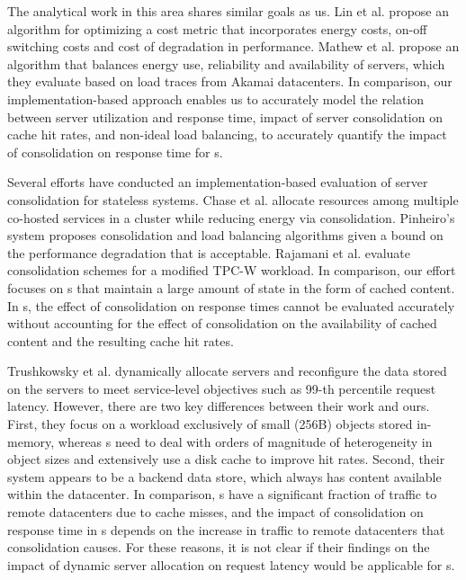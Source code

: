The analytical work in this area shares similar goals as us.  Lin et al. \cite{lin12} propose an algorithm for optimizing a cost metric that incorporates energy costs, on-off switching costs and cost of degradation in performance. Mathew et al. \cite{mathew12} propose an algorithm that balances energy use, reliability and availability of servers, which they evaluate based on load traces from Akamai datacenters. In comparison, our implementation-based approach enables us to accurately model the relation between server utilization and response time, impact of server consolidation on cache hit rates, and non-ideal load balancing, to accurately quantify the impact of consolidation on response time for \cdc s.

Several efforts have conducted an implementation-based evaluation of server consolidation for stateless systems. Chase et al. \cite{chase2001managing} allocate resources among multiple co-hosted services in a cluster while reducing energy via consolidation. Pinheiro's \cite{pinheiro2001load} system proposes consolidation and load balancing algorithms given a bound on the performance degradation that is acceptable.  Rajamani et al. \cite{rajamani2003evaluating} evaluate consolidation schemes for a modified TPC-W workload. In comparison, our effort focuses on \cdc s that maintain a large amount of state in the form of cached content. In \cdc s, the effect of consolidation on response times cannot be evaluated accurately without accounting for the effect of consolidation on the availability of cached content and the resulting cache hit rates.

Trushkowsky et al. \cite{Trushkowsky:2011}  dynamically allocate servers and reconfigure the data stored on the servers to meet service-level objectives such as 99-th percentile request latency.  However, there are two key differences between their work and ours. First, they focus  on a workload exclusively of small (256B) objects stored in-memory, whereas  \cdc s need to deal with orders of magnitude of heterogeneity in object sizes and extensively use a disk cache to improve hit rates.  Second, their system appears to be a backend data store, which always has content available within the datacenter. In comparison, \cdc s have a significant fraction of traffic to remote datacenters due to cache misses, and the impact of consolidation on response time in \cdc s depends on the increase in traffic to remote datacenters that consolidation causes. For these reasons, it is not clear if their findings on the impact of dynamic server allocation on request latency would be applicable for \cdc s.

